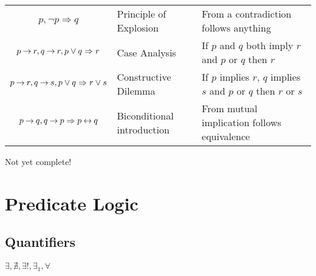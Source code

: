 \begin{tabular}{c l l}
  $p, \neg p \Rightarrow q$                                     & 
  Principle of Explosion                                        & 
  From a contradiction follows anything                         \\   
  
  $p \mathbin{\rightarrow} r, q \mathbin{\rightarrow} r, p \vee q \Rightarrow r$                & 
  Case Analysis                                                 & 
  If $p$ and $q$ both imply $r$ and $p$ or $q$ then $r$         \\ 
  
  $p \mathbin{\rightarrow} r, q \mathbin{\rightarrow} s, p \vee q \Rightarrow r \vee s$         & 
  Constructive Dilemma                                          & 
  If $p$ implies $r$, $q$ implies $s$ and $p$ or $q$ then $r$ or $s$         \\ 
  
  $p \mathbin{\rightarrow} q, q \mathbin{\rightarrow} p \Rightarrow p \mathbin{\leftrightarrow} q$                & 
  Biconditional introduction                                    & 
  From mutual implication follows equivalence                   \\   
  
\end{tabular}
\medskip

Not yet complete!














\section{Predicate Logic}



\subsection{Quantifiers}

$\exists, \nexists, \exists!, \exists_1, \forall$


